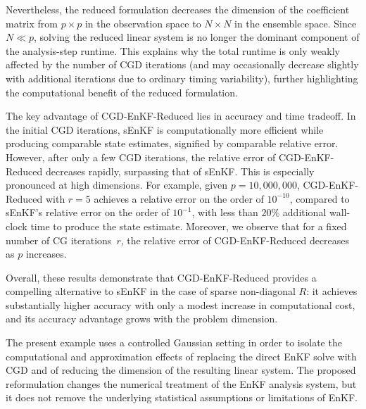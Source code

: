 \documentclass[11p]{elsarticle}
\numberwithin{equation}{section}
\begin{document}
{
Nevertheless, the reduced formulation decreases the dimension of
the coefficient matrix from $p\times p$ in the observation space
to $N\times N$ in the ensemble space. Since $N\ll p$, solving the
reduced linear system is no longer the dominant component of the
analysis-step runtime. This explains why the total runtime is only
weakly affected by the number of CGD iterations (and may occasionally
decrease slightly with additional iterations due to ordinary timing
variability), further highlighting the computational benefit of the
reduced formulation.
}

  The key advantage of CGD-EnKF-Reduced lies in accuracy and time tradeoff.  In the initial CGD iterations, sEnKF is computationally more efficient while producing comparable state estimates, signified by comparable relative error.  However, after only a few CGD iterations, the relative error of CGD-EnKF-Reduced decreases rapidly, surpassing that of sEnKF.  This is especially pronounced at high dimensions.  For example, given $p = 10{,}000{,}000$, CGD-EnKF-Reduced with $r = 5$ achieves a relative error on the order of $10^{-10}$, compared to sEnKF's relative error on the order of $10^{-1}$, with less than $20\%$ additional wall-clock time to produce the state estimate.  Moreover, we observe that for a fixed number of CG iterations~$r$, the
  relative error of CGD-EnKF-Reduced decreases as $p$ increases.

  Overall, these results demonstrate that CGD-EnKF-Reduced provides a compelling alternative to sEnKF in the case of sparse non-diagonal $R$: it achieves substantially higher accuracy with only a modest increase in computational cost, and its
  accuracy advantage grows with the problem dimension.

{
The present example uses a controlled Gaussian setting in order to
isolate the computational and approximation effects of replacing
the direct EnKF solve with CGD and of reducing the dimension of the
resulting linear system. The proposed reformulation changes the numerical treatment
of the EnKF analysis system, but it does not remove the underlying
statistical assumptions or limitations of EnKF.}
\end{document}
